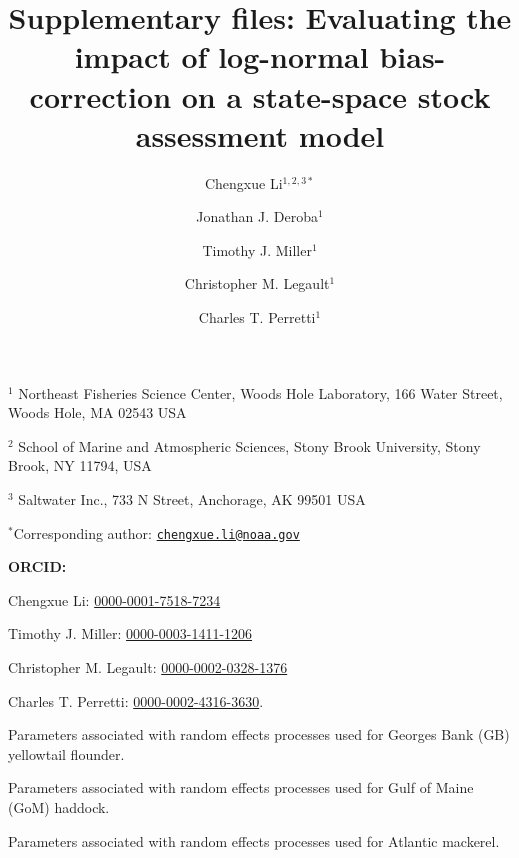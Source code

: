 \documentclass[
  12pt,
]{article}
\title{Supplementary files: Evaluating the impact of log-normal
bias-correction on a state-space stock assessment model}
\author{Chengxue Li\(^{1,2,3*}\) \and Jonathan J.
Deroba\(^1\) \and Timothy J. Miller\(^1\) \and Christopher M.
Legault\(^1\) \and Charles T. Perretti\(^1\)}
\date{}
\begin{document}
\maketitle

\(^1\) Northeast Fisheries Science Center, Woods Hole Laboratory, 166
Water Street, Woods Hole, MA 02543 USA

\(^2\) School of Marine and Atmospheric Sciences, Stony Brook
University, Stony Brook, NY 11794, USA

\(^3\) Saltwater Inc., 733 N Street, Anchorage, AK 99501 USA

\(^*\)Corresponding author:
\href{mailto:chengxue.li@noaa.gov}{\nolinkurl{chengxue.li@noaa.gov}}

\vspace{0.5cm}

\textbf{ORCID:}

Chengxue Li:
\href{https://orcid.org/0000-0001-7518-7234}{0000-0001-7518-7234}

Timothy J. Miller:
\href{https://orcid.org/0000-0003-1411-1206}{0000-0003-1411-1206}

Christopher M. Legault:
\href{https://orcid.org/0000-0002-0328-1376}{0000-0002-0328-1376}

Charles T. Perretti:
\href{https://orcid.org/0000-0002-4316-3630}{0000-0002-4316-3630}.

\pagebreak

\renewcommand{\thetable}{S\arabic{table}}
\setcounter{table}{0}

\begin{table}[H]
    \centering
    \caption{Parameters associated with random effects processes used for Georges Bank (GB) yellowtail flounder.}
    \label{supp_flounder_table}
    
\end{table}

\begin{table}[H]
    \centering
    \caption{Parameters associated with random effects processes used for Gulf of Maine (GoM) haddock.}
    \label{supp_haddock_table}
    
\end{table}

\begin{table}[H]
    \centering
    \caption{Parameters associated with random effects processes used for Atlantic mackerel.}
    \label{supp_mackerel_table}
    
\end{table}
\end{document}
